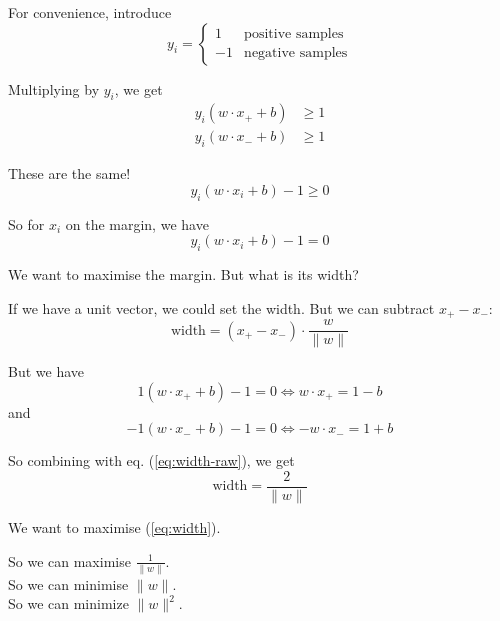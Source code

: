 For convenience, introduce
\begin{equation*}
  y_i =
  \begin{cases}
    1 & \mbox{positive samples} \\
    -1 & \mbox{negative samples}
  \end{cases}
\end{equation*}

Multiplying by $y_i$, we get
\begin{align*}
  y_i(w\cdot x_+ + b) & \ge 1
  \\
  y_i(w\cdot x_- + b) & \ge 1
\end{align*}

These are the same!
\begin{displaymath}
  y_i(w\cdot x_i + b) - 1 \ge 0
\end{displaymath}

So for $x_i$ on the margin, we have
\begin{equation}
  \label{eq:on-margin}
  \boxed{y_i(w\cdot x_i + b) - 1 = 0}
\end{equation}

We want to maximise the margin.  But what is its width?

If we have a unit vector, we could set the width.  But we can subtract $x_+-x_-$:
\begin{equation}
  \label{eq:width-raw}
  \mbox{width} = (x_+ - x_-) \cdot \frac{w}{\parallel w\parallel}
\end{equation}

But we have
\begin{displaymath}
  1(w\cdot x_+ + b) - 1 = 0 \iff w\cdot x_+ = 1-b
\end{displaymath}
and
\begin{displaymath}
  -1(w\cdot x_- + b) - 1 = 0 \iff -w\cdot x_- = 1+b
\end{displaymath}

So combining with eq. (\ref{eq:width-raw}), we get
\begin{equation}
  \label{eq:width}
  \mbox{width} = \frac{2}{\parallel w\parallel}
\end{equation}

We want to maximise (\ref{eq:width}).

So we can maximise $\frac{1}{\parallel w\parallel}$. \\[2mm]
So we can minimise $\parallel w\parallel$.\\[2mm]
So we can minimize $\parallel w\parallel^2$.

\bigskip

